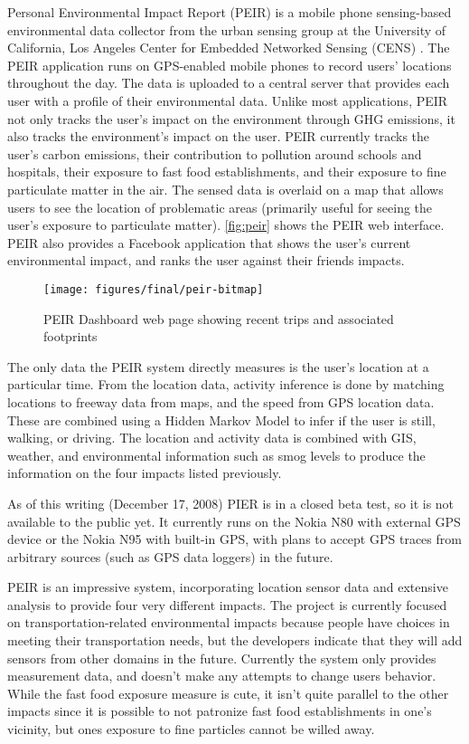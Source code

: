 Personal Environmental Impact Report (PEIR) is a mobile phone sensing-based environmental data collector from the urban sensing group at the University of California, Los Angeles Center for Embedded Networked Sensing (CENS) \cite{peir-website, agapie-2008-seeing-our-signals}. The PEIR application runs on GPS-enabled mobile phones to record users' locations throughout the day. The data is uploaded to a central server that provides each user with a profile of their environmental data. Unlike most applications, PEIR not only tracks the user's impact on the environment through GHG emissions, it also tracks the environment's impact on the user. PEIR currently tracks the user's carbon emissions, their contribution to pollution around schools and hospitals, their exposure to fast food establishments, and their exposure to fine particulate matter in the air. The sensed data is overlaid on a map that allows users to see the location of problematic areas (primarily useful for seeing the user's exposure to particulate matter). \autoref{fig:peir} shows the PEIR web interface. PEIR also provides a Facebook application that shows the user's current environmental impact, and ranks the user against their friends impacts.

\begin{figure}[htbp]
	\begin{center}
		\texttt{[image: figures/final/peir-bitmap]}
		\caption{PEIR Dashboard web page showing recent trips and associated footprints}
		\label{fig:peir}
 	\end{center}
\end{figure}

The only data the PEIR system directly measures is the user's location at a particular time. From the location data, activity inference is done by matching locations to freeway data from maps, and the speed from GPS location data. These are combined using a Hidden Markov Model to infer if the user is still, walking, or driving. The location and activity data is combined with GIS, weather, and environmental information such as smog levels to produce the information on the four impacts listed previously.

As of this writing (December 17, 2008) PIER is in a closed beta test, so it is not available to the public yet. It currently runs on the Nokia N80 with external GPS device or the Nokia N95 with built-in GPS, with plans to accept GPS traces from arbitrary sources (such as GPS data loggers) in the future.

PEIR is an impressive system, incorporating location sensor data and extensive analysis to provide four very different impacts. The project is currently focused on transportation-related environmental impacts because people have  choices in meeting their transportation needs, but the developers indicate that they will add sensors from other domains in the future. Currently the system only provides measurement data, and doesn't make any attempts to change users behavior. While the fast food exposure measure is cute, it isn't quite parallel to the other impacts since it is possible to not patronize fast food establishments in one's vicinity, but ones exposure to fine particles cannot be willed away.

